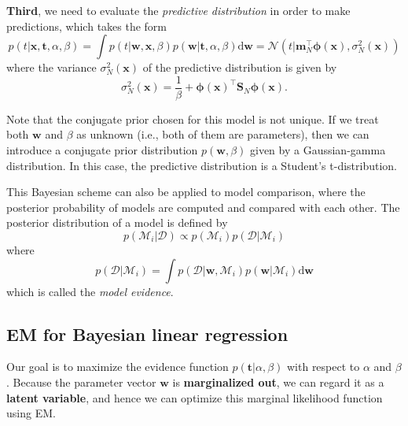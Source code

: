 \documentclass[a4paper]{book}
\newcommand{\ud}{\mathrm{d}}
\renewcommand{\bf}{\mathbf}
\renewcommand{\cal}{\mathcal}
\newcommand{\imp}[1]{\textit{#1}}
\newcommand{\bs}{\boldsymbol}
\begin{document}
\textbf{Third}, we need to evaluate the \imp{predictive distribution} in order to make predictions, which takes the form
\begin{equation}
	p(t|\bf{x,t},\alpha,\beta) = \int p(t|\bf{w,x},\beta)p(\bf{w}|\bf{t},\alpha,\beta)\ud \bf{w} = \cal{N}(t|\bf{m}_N^{\intercal} \bs{\phi}(\bf{x}),\sigma_N^2(\bf{x}))
\end{equation}
where the variance $\sigma^2_N(\bf{x})$ of the predictive distribution is given by
\begin{equation}
	\sigma_N^2(\bf{x}) = \frac{1}{\beta} + \bs{\phi}(\bf{x})^{\intercal} \bf{S}_N \bs{\phi}(\bf{x}).  \label{LRPreVar}
\end{equation}

Note that the conjugate prior chosen for this model is not unique. If we treat both $\bf{w}$ and $\beta$ as unknown (i.e., both of them are parameters), then we can introduce a conjugate prior distribution $p(\bf{w},\beta)$ given by a Gaussian-gamma distribution. In this case, the predictive distribution is a Student's t-distribution.

This Bayesian scheme can also be applied to model comparison, where the posterior probability of models are computed and compared with each other.  The posterior distribution of a model is defined by
\begin{equation}
	p(\cal{M}_i|\cal{D}) \propto p(\cal{M}_i)p(\cal{D}|\cal{M}_i)
\end{equation}
where
\begin{equation}
	p(\cal{D}|\cal{M}_i) = \int p(\cal{D}|\bf{w},\cal{M}_i)p(\bf{w}|\cal{M}_i)\ud \bf{w}
\end{equation}
which is called the \imp{model evidence}.
\subsection{EM for Bayesian linear regression}
Our goal is to maximize the evidence function $p(\bf{t}|\alpha,\beta)$ with respect to $\alpha$ and $\beta$. Because the parameter vector $\bf{w}$ is \textbf{marginalized out}, we can regard it as a \textbf{latent variable}, and hence we can optimize this marginal likelihood function using EM.
\end{document}
